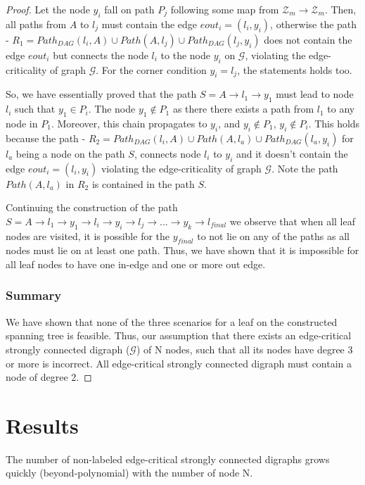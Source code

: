 \documentclass[runningheads]{llncs}
\begin{document}
\begin{proof}
Let the node $y_i$ fall on path $P_j$ following some map from $\mathcal{Z}_m \rightarrow \mathcal{Z}_m$. Then, all paths from $A$ to $l_j$ must contain the edge $eout_i = (l_i, y_i)$, otherwise the path - $R_1 = Path_{DAG}(l_i, A) \cup Path(A, l_j) \cup Path_{DAG}(l_j, y_i)$ does not contain the edge $eout_i$ but connects the node $l_i$ to the node $y_i$ on $\mathcal{G}$, violating the edge-criticality of graph $\mathcal{G}$. For the corner condition $y_i = l_j$, the statements holds too.

So, we have essentially proved that the path $S = A \rightarrow l_1 \rightarrow y_1$ must lead to node $l_i$ such that $y_1 \in P_i$. The node $y_1 \notin P_1$ as there there exists a path from $l_1$ to any node in $P_1$. Moreover, this chain propagates to $y_i$, and $y_i \notin P_1$, $y_i \notin P_i$. This holds because the path - $R_2 = Path_{DAG}(l_i, A) \cup Path(A, l_a) \cup Path_{DAG}(l_a, y_i)$ for $l_a$ being a node on the path $S$, connects node $l_i$ to $y_i$ and it doesn't contain the edge $eout_i = (l_i, y_i)$ violating the edge-criticality of graph $\mathcal{G}$. Note the path $Path(A, l_a)$ in $R_2$ is contained in the path $S$. 

Continuing the construction of the path $S = A \rightarrow l_1 \rightarrow y_1 \rightarrow l_i \rightarrow y_i \rightarrow l_j \rightarrow ... \rightarrow y_k \rightarrow l_{final}$ we observe that when all leaf nodes are visited, it is possible for the $y_{final}$ to not lie on any of the paths as all nodes must lie on at least one path. Thus, we have shown that it is impossible for all leaf nodes to have one in-edge and one or more out edge.

\subsubsection{Summary} We have shown that none of the three scenarios for a leaf on the constructed spanning tree is feasible. Thus, our assumption that there exists an edge-critical strongly connected digraph ($\mathcal{G}$) of N nodes, such that all its nodes have degree 3 or more is incorrect. All edge-critical strongly connected digraph must contain a node of degree 2.
\end{proof}

\section{Results}
The number of non-labeled edge-critical strongly connected digraphs grows quickly (beyond-polynomial) with the number of node N.
\end{document}
